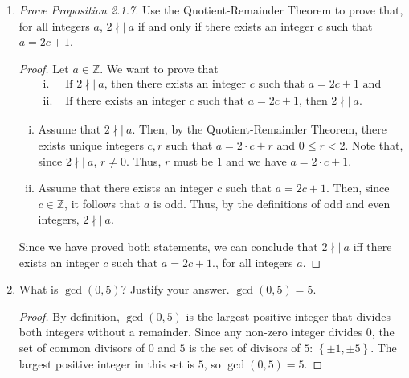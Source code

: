 \documentclass{article}
\begin{document}
\begin{enumerate}
\begin{proof}
\begin{enumerate}[i.]
                    \end{enumerate}
                    Since we have proved both statements, we can conclude that $3 \mid a$ iff $3 \mid a^2$, for all integers $a$.
                \end{proof}

    	\item \emph{Prove Proposition 2.1.7.} Use the Quotient-Remainder Theorem to prove that, for all integers $a$, $2\nmid|\ a$ if and only if there exists an integer $c$ such that $a = 2c + 1$.
                \begin{proof}
                    Let $a\in\mathbb{Z}$. We want to prove that 
                    \begin{align*}
                        \text{i. }   & \text{If $2\nmid|\ a$, then there exists an integer $c$ such that $a = 2c + 1$ and}  \\
                        \text{ii. }  & \text{If there exists an integer $c$ such that $a = 2c + 1$, then $2\nmid|\ a$.}
                    \end{align*}
                                
                    \begin{enumerate}[i.]
                        \item Assume that $2\nmid|\ a$. Then, by the Quotient-Remainder Theorem, there exists unique integers $c,r$ such that $a = 2\cdot c + r$ and $0 \le r < 2$. Note that, since $2\nmid|\ a$, $r \neq 0$. Thus, $r$ must be $1$ and we have $a = 2\cdot c + 1$. \\
                                    
                        \item Assume that there exists an integer $c$ such that $a = 2c + 1$. Then, since $c\in\mathbb{Z}$, it follows that $a$ is odd. Thus, by the definitions of odd and even integers, $2\nmid|\ a$. 
                    \end{enumerate}
                    Since we have proved both statements, we can conclude that $2\nmid|\ a$ iff there exists an integer $c$ such that $a = 2c + 1$., for all integers $a$.
                \end{proof}

    	\item What is $\gcd(0,5)$?  Justify your answer.
                $\gcd(0, 5) = 5$.
                \begin{proof}
                    By definition, $\gcd(0, 5)$ is the largest positive integer that divides both integers without a remainder. Since any non-zero integer divides $0$, the set of common divisors of $0$ and $5$ is the set of divisors of $5$: $\left\{ \pm1, \pm5 \right\}$. The largest positive integer in this set is $5$, so $\gcd(0, 5) = 5$.
                \end{proof}


\end{enumerate}
\end{document}
